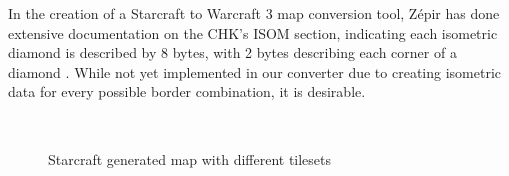 \documentclass[letterpaper]{article}
\begin{document}
In the creation of a Starcraft to Warcraft 3 map conversion tool, Z\'{e}pir has done extensive documentation on the CHK's ISOM section, indicating each isometric diamond is described by 8 bytes, with 2 bytes describing each corner of a diamond \cite{Zepir}. While not yet implemented in our converter due to creating isometric data for every possible border combination, it is desirable.

\begin{figure}[ht]
  \centering
  ~ %
  ~ %
  \caption{Starcraft generated map with different tilesets}
  \label{fig:final-maps}
\end{figure}
\end{document}
